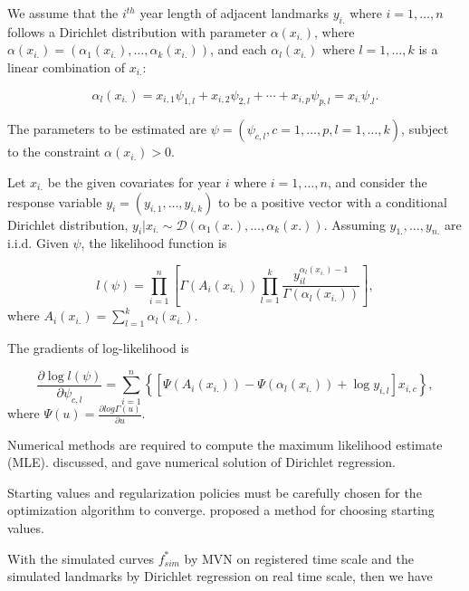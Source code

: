 \documentclass{article}
\begin{document}
We assume that the $i^{th}$ year length of adjacent landmarks $y_{i.}$ where $i=1,\dots,n$ follows a Dirichlet distribution with parameter $\alpha(x_{i.})$, where $\alpha(x_{i.})=(\alpha_1(x_{i.}),\dots,\alpha_k(x_{i.}))$, and each $\alpha_l(x_{i.})$ where $l=1,\dots,k$ is a linear combination of $x_{i.}$:

\begin{equation}
\alpha_l(x_{i.}) = x_{i,1}\psi_{1,l} + x_{i,2}\psi_{2,l} +\cdots + x_{i,p}\psi_{p,l} = x_{i.}\psi_{.l}.
\end{equation}

The parameters to be estimated are $\psi=(\psi_{c,l},c=1,\dots,p,l=1,\dots,k)$, subject to the constraint $\alpha(x_{i.})>0$.

Let $x_{i.}$ be the given covariates for year $i$ where $i=1,\dots,n$, and consider the response variable $y_i=(y_{i,1},\dots,y_{i,k})$ to be a positive vector with a conditional Dirichlet distribution, $y_i|x_{i.}\sim \mathcal{D}(\alpha_1(x.),\dots,\alpha_k(x.))$. 
Assuming $y_{1.},\dots,y_{n.}$ are i.i.d. Given $\psi$, the likelihood function is

\begin{equation}
l(\psi) = \prod_{i=1}^{n}\left[\Gamma(A_i(x_{i.}))\prod_{l=1}^k\frac{y_{il}^{\alpha_l(x_{i.})-1}}{\Gamma(\alpha_l(x_{i.}))}\right],
\end{equation}
where $A_i(x_{i.})=\sum_{l=1}^k\alpha_l(x_{i.})$.

The gradients of log-likelihood is 

\begin{equation} 
\frac{\partial \log l(\psi)}{\partial\psi_{c,l}} = \sum_{i=1}^{n}\left\{[\Psi(A_i(x_{i.}))-\Psi(\alpha_l(x_{i.}))+\log y_{i,l}]x_{i,c}\right\},
\end{equation}
where $\Psi(u) = \frac{\partial log\Gamma(u)}{\partial u}$.

\medskip

Numerical methods are required to compute the maximum likelihood estimate (MLE). \citet{camargo2012estimation} discussed, and gave numerical solution of Dirichlet regression. 

Starting values and regularization policies must be carefully chosen for the optimization algorithm to converge. \citet{hijazi2009modelling} proposed a method for choosing starting values. 

\medskip

With the simulated curves $f^{*}_{sim}$ by MVN on registered time scale and the simulated landmarks by Dirichlet regression on real time scale, then we have 
\end{document}
